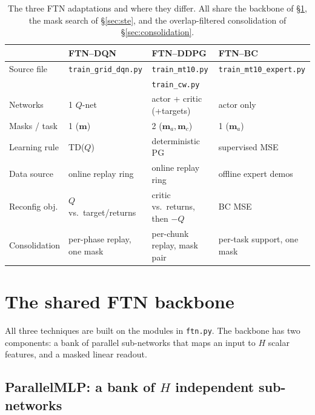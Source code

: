 \documentclass[11pt]{article}
\newcommand{\mask}{\bm{m}}                 %
\newcommand{\Ho}{H}                        %
\newcommand{\code}[1]{\texttt{\small #1}}
\begin{document}
\begin{table}[t]
\centering
\small
\begin{tabular}{@{}llll@{}}
\toprule
 & \textbf{FTN--DQN} & \textbf{FTN--DDPG} & \textbf{FTN--BC}\\
\midrule
Source file & \code{train\_grid\_dqn.py} & \code{train\_mt10.py} & \code{train\_mt10\_expert.py}\\
            &                            & \code{train\_cw.py}    & \\
Networks    & 1 $Q$-net                  & actor + critic (+targets) & actor only\\
Masks / task& 1 ($\mask$)                & 2 ($\mask_a,\mask_c$)     & 1 ($\mask_a$)\\
Learning rule& TD($Q$)                   & deterministic PG          & supervised MSE\\
Data source & online replay ring          & online replay ring        & offline expert demos\\
Reconfig obj.& $Q$ vs.\ target/returns    & critic vs.\ returns, then $-Q$ & BC MSE\\
Consolidation& per-phase replay, one mask & per-chunk replay, mask pair & per-task support, one mask\\
\bottomrule
\end{tabular}
\caption{The three FTN adaptations and where they differ. All share the backbone
of \S\ref{sec:backbone}, the mask search of \S\ref{sec:ste}, and the
overlap-filtered consolidation of \S\ref{sec:consolidation}.}
\label{tab:map}
\end{table}

\section{The shared FTN backbone}
\label{sec:backbone}

All three techniques are built on the modules in \code{ftn.py}. The backbone has
two components: a bank of parallel sub-networks that maps an input to $\Ho$ scalar
features, and a masked linear readout.

\subsection{ParallelMLP: a bank of $\Ho$ independent sub-networks}
\end{document}
